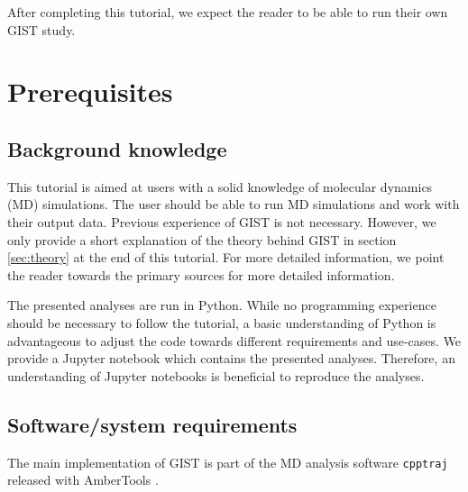 \documentclass[9pt,tutorial]{livecoms}
\newcommand{\software}{\texttt}
\begin{document}
After completing this tutorial, we expect the reader to be able to run their own GIST study. 

%

\section{Prerequisites}


\subsection{Background knowledge}
This tutorial is aimed at users with a solid knowledge of molecular dynamics (MD) simulations.
The user should be able to run MD simulations and work with their output data.
Previous experience of GIST is not necessary.
However, we only provide a short explanation of the theory behind GIST in section \ref{sec:theory} at the end of this tutorial. For more detailed information, we point the reader towards the primary sources for more detailed information.

The presented analyses are run in Python.
While no programming experience should be necessary to follow the tutorial, a basic understanding of Python is advantageous to adjust the code towards different requirements and use-cases. 
We provide a Jupyter notebook which contains the presented analyses. 
Therefore, an understanding of Jupyter notebooks is beneficial to reproduce the analyses.

\subsection{Software/system requirements}
The main implementation of GIST is part of the MD analysis software \software{cpptraj} released with AmberTools \cite{amber22}.
\end{document}

